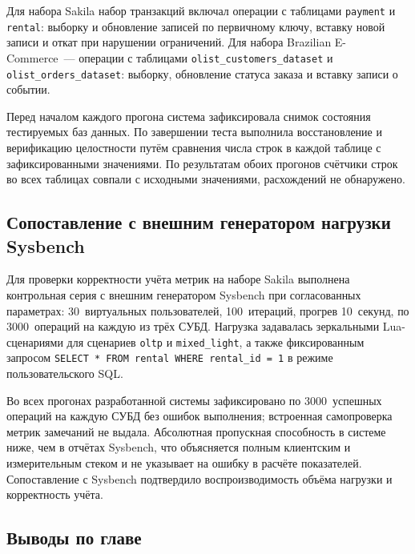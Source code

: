 Для набора Sakila набор транзакций включал операции с таблицами \texttt{payment} и \texttt{rental}: выборку и обновление записей по первичному ключу, вставку новой записи и откат при нарушении ограничений. Для набора Brazilian E-Commerce~--- операции с таблицами \texttt{olist\_customers\_dataset} и \texttt{olist\_orders\_dataset}: выборку, обновление статуса заказа и вставку записи о событии.

Перед началом каждого прогона система зафиксировала снимок состояния тестируемых баз данных. По завершении теста выполнила восстановление и верификацию целостности путём сравнения числа строк в каждой таблице с зафиксированными значениями. По результатам обоих прогонов счётчики строк во всех таблицах совпали с исходными значениями, расхождений не обнаружено.

\subsection{Сопоставление с внешним генератором нагрузки Sysbench}

Для проверки корректности учёта метрик на наборе Sakila выполнена контрольная серия с внешним генератором Sysbench при согласованных параметрах: 30~виртуальных пользователей, 100~итераций, прогрев 10~секунд, по 3000~операций на каждую из трёх СУБД. Нагрузка задавалась зеркальными Lua-сценариями для сценариев \texttt{oltp} и \texttt{mixed\_light}, а также фиксированным запросом \texttt{SELECT * FROM rental WHERE rental\_id = 1} в режиме пользовательского SQL.

Во всех прогонах разработанной системы зафиксировано по 3000~успешных операций на каждую СУБД без ошибок выполнения; встроенная самопроверка метрик замечаний не выдала. Абсолютная пропускная способность в системе ниже, чем в отчётах Sysbench, что объясняется полным клиентским и измерительным стеком и не указывает на ошибку в расчёте показателей. Сопоставление с Sysbench подтвердило воспроизводимость объёма нагрузки и корректность учёта.

\subsection{Выводы по главе}

